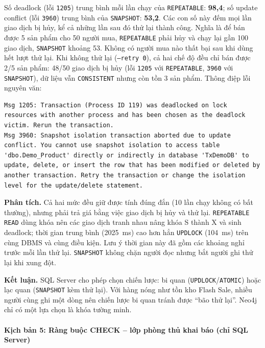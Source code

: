 Số deadlock (lỗi \texttt{1205}) trung bình mỗi lần chạy của \texttt{REPEATABLE}: \textbf{98,4}; số update conflict (lỗi \texttt{3960}) trung bình của \texttt{SNAPSHOT}: \textbf{53,2}. Các con số này đếm mọi lần giao dịch bị hủy, kể cả những lần sau đó thử lại thành công. Nghĩa là để bán được 5 sản phẩm cho 50 người mua, \texttt{REPEATABLE} phải hủy và chạy lại gần 100 giao dịch, \texttt{SNAPSHOT} khoảng 53. Không có người mua nào thất bại sau khi dùng hết lượt thử lại. Khi không thử lại (\texttt{--retry 0}), cả hai chế độ đều chỉ bán được 2/5 sản phẩm: 48/50 giao dịch bị hủy (lỗi \texttt{1205} với \texttt{REPEATABLE}, \texttt{3960} với \texttt{SNAPSHOT}), dữ liệu vẫn \texttt{CONSISTENT} nhưng còn tồn 3 sản phẩm. Thông điệp lỗi nguyên văn:
\begin{lstlisting}[basicstyle=\ttfamily\footnotesize, breaklines=true, frame=single]
Msg 1205: Transaction (Process ID 119) was deadlocked on lock resources with another process and has been chosen as the deadlock victim. Rerun the transaction.
Msg 3960: Snapshot isolation transaction aborted due to update conflict. You cannot use snapshot isolation to access table 'dbo.Demo_Product' directly or indirectly in database 'TxDemoDB' to update, delete, or insert the row that has been modified or deleted by another transaction. Retry the transaction or change the isolation level for the update/delete statement.
\end{lstlisting}

\textbf{Phân tích.} Cả hai mức đều giữ được tính đúng đắn (10 lần chạy không có bất thường), nhưng phải trả giá bằng việc giao dịch bị hủy và thử lại. \texttt{REPEATABLE READ} dùng khóa nên các giao dịch tranh nhau nâng khóa S thành X và sinh deadlock; thời gian trung bình (2025~ms) cao hơn hẳn \texttt{UPDLOCK} (104~ms) trên cùng DBMS và cùng điều kiện. Lưu ý thời gian này đã gồm các khoảng nghỉ trước mỗi lần thử lại. \texttt{SNAPSHOT} không chặn người đọc nhưng bắt người ghi thử lại khi xung đột.

\textbf{Kết luận.} SQL Server cho phép chọn chiến lược: bi quan (\texttt{UPDLOCK}/\texttt{ATOMIC}) hoặc lạc quan (\texttt{SNAPSHOT} kèm thử lại). Với hàng nóng như tồn kho Flash Sale, nhiều người cùng ghi một dòng nên chiến lược bi quan tránh được ``bão thử lại''. Neo4j chỉ có một lựa chọn là khóa tường minh.

\paragraph{Kịch bản 5: Ràng buộc CHECK -- lớp phòng thủ khai báo (chỉ SQL Server)}
\label{par:tx-kb5}\mbox{}

